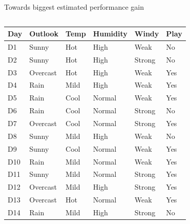 \documentclass[usenames,dvipsnames]{beamer}
\begin{document}
\begin{frame}{Towards biggest estimated performance gain}
\begin{columns}
\begin{column}{.7\textwidth}
\begin{scriptsize}
\begin{tabular}{lllll||l} \toprule
\textbf{Day} & \textbf{Outlook}  & \textbf{Temp} & \textbf{Humidity} & \textbf{Windy}  & \textbf{Play} \\ \midrule
D1  & Sunny    & Hot  & High     & Weak   & No   \\
D2  & Sunny    & Hot  & High     & Strong & No   \\
D3  & Overcast & Hot  & High     & Weak   & Yes  \\
D4  & Rain     & Mild & High     & Weak   & Yes  \\
D5  & Rain     & Cool & Normal   & Weak   & Yes  \\
D6  & Rain     & Cool & Normal   & Strong & No   \\
D7  & Overcast & Cool & Normal   & Strong & Yes  \\
D8  & Sunny    & Mild & High     & Weak   & No   \\
D9  & Sunny    & Cool & Normal   & Weak   & Yes  \\
D10 & Rain     & Mild & Normal   & Weak   & Yes  \\
D11 & Sunny    & Mild & Normal   & Strong & Yes  \\
D12 & Overcast & Mild & High     & Strong & Yes  \\
D13 & Overcast & Hot  & Normal   & Weak   & Yes  \\
D14 & Rain     & Mild & High     & Strong & No  \\ \bottomrule
\end{tabular}
\end{scriptsize}
\end{column}
\end{columns}
\end{frame}
\end{document}
